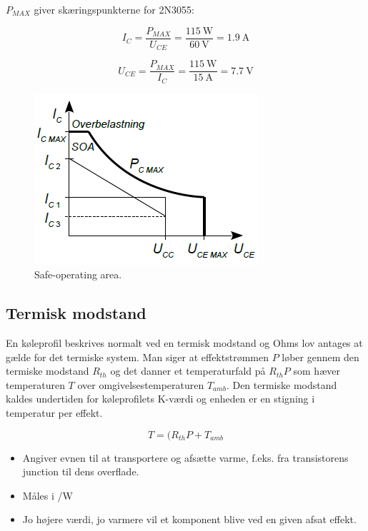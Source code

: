 \documentclass[danish]{article}
\begin{document}
$P_{MAX}$ giver skæringspunkterne for 2N3055:

\begin{equation}
I_C = \dfrac{P_{MAX}}{U_{CE}} = \dfrac{\SI{115}{\watt}}{\SI{60}{\volt}} = \SI{1.9}{\ampere}
\end{equation}

\begin{equation}
U_{CE} = \dfrac{P_{MAX}}{I_C} = \dfrac{\SI{115}{\watt}}{\SI{15}{\ampere}} = \SI{7.7}{\volt}
\end{equation}

\begin{figure} [H]
	\centering
	\includegraphics[width=0.4\linewidth]{graphics/soa}
	\caption{Safe-operating area.}
	\label{fig:soa}
\end{figure}


\subsection{Termisk modstand}
En køleprofil beskrives normalt ved en termisk modstand og Ohms lov antages at gælde for det termiske system. 
Man siger at effektstrømmen $P$ løber gennem den termiske modstand $R_{th}$ og det danner et temperaturfald på $R_{th}P$ som hæver temperaturen $T$ over omgivelsestemperaturen $T_{amb}$.
Den termiske modstand kaldes undertiden for køleprofilets K-værdi og enheden er en stigning i temperatur per effekt.

\begin{equation}
T = (R_{th} P + T_{amb}
\end{equation}

\begin{itemize}
	\item Angiver evnen til at transportere og afsætte varme, f.eks. fra transistorens junction til dens overflade.
	\item Måles i \SIUnitSymbolCelsius /\si{\watt}
	\item Jo højere værdi, jo varmere vil et komponent blive ved en given afsat effekt.
\end{itemize}
\end{document}
